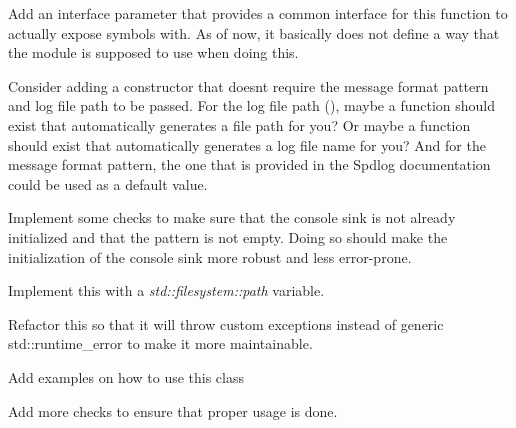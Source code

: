 \begin{DoxyRefList}
%
Add an interface parameter that provides a common interface for this function to actually expose symbols with. As of now, it basically does not define a way that the module is supposed to use when doing this. 
\item[Class \doxylink{class_atlas_1_1_spdlog_logger}{Atlas\+::Spdlog\+Logger} ]\label{todo__todo000010}%
%
Consider adding a constructor that doesn\textquotesingle{}t require the message format pattern and log file path to be passed. For the log file path (), maybe a function should exist that automatically generates a file path for you? Or maybe a function should exist that automatically generates a log file name for you? And for the message format pattern, the one that is provided in the Spdlog documentation could be used as a default value.  
\item[Member \doxylink{class_atlas_1_1_spdlog_logger_af450fb0c93980c5855e5acde4bc2c3a2}{Atlas\+::Spdlog\+Logger\+::init\+Console\+Sink} ()]\label{todo__todo000012}%
%
Implement some checks to make sure that the console sink is not already initialized and that the pattern is not empty. Doing so should make the initialization of the console sink more robust and less error-\/prone.  
\item[Member \doxylink{class_atlas_1_1_spdlog_logger_a036c493624eda8cb7e17a20d0281eb46}{Atlas\+::Spdlog\+Logger\+::m\+Log\+File\+Path} ]\label{todo__todo000011}%
%
Implement this with a {\itshape std\+::filesystem\+::path} variable.  
\item[Class \doxylink{class_atlas_1_1_thread_budget}{Atlas\+::Thread\+Budget} ]\label{todo__todo000002}%
%
Refactor this so that it will throw custom exceptions instead of generic std\+::runtime\+\_\+error to make it more maintainable. 
\item[Class \doxylink{class_atlas_1_1_validatable}{Atlas\+::Validatable} ]\label{todo__todo000001}%
%
Add examples on how to use this class  
\item[Member \doxylink{class_atlas_1_1_viewport_ac137d3a44f5576ed874ae384231c4a2e}{Atlas\+::Viewport\+::apply\+Viewport\+To\+Command\+Buffer} (Vk\+Command\+Buffer command\+Buffer)]\label{todo__todo000013}%
%
Add more checks to ensure that proper usage is done.
\end{DoxyRefList}